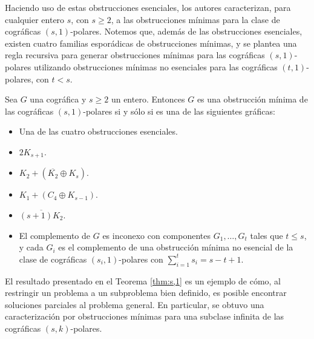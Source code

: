 Haciendo uso de estas obstrucciones esenciales,
los autores caracterizan, para cualquier entero
$s$, con $s \ge 2$, a las obstrucciones m\'inimas
para la clase de cogr\'aficas $(s,1)$-polares.
Notemos que, adem\'as de las
obstrucciones esenciales, existen cuatro familias
espor\'adicas de obstrucciones m\'inimas, y se
plantea una regla recursiva para generar
obstrucciones m\'inimas para las cogr\'aficas
$(s,1)$-polares utilizando obstrucciones
m\'inimas no esenciales para las cogr\'aficas
$(t,1)$-polares, con $t < s$.

\begin{theorem}
\label{thm:s,1}
  Sea $G$ una cográfica y $s \ge 2$ un entero. Entonces
  $G$ es una obstrucción mínima de las cográficas
  $(s,1)$-polares si y sólo si es una de las siguientes
  gráficas:

  \begin{itemize}
    \item Una de las cuatro obstrucciones esenciales.

    \item $2K_{s+1}$.

    \item $K_2 + (\overline{K_2}\oplus K_s)$.

    \item $K_1 + (C_4 \oplus K_{s-1})$.

    \item $\overline{(s+1)K_2}$.

    \item El complemento de $G$ es inconexo con componentes
      $G_1, \dots, G_t$ tales que $t \leq s$, y cada $G_i$
      es el complemento de una obstrucción mínima no esencial
      de la clase de cográficas $(s_i, 1)$-polares con
      $\sum^{t}_{i=1}s_i = s-t+1$.
  \end{itemize}
\end{theorem}


El resultado presentado en el Teorema
\ref{thm:s,1} es un ejemplo de c\'omo, al restringir
un problema a un subproblema bien definido, es posible
encontrar soluciones parciales al problema general.   En
particular, se obtuvo una caracterizaci\'on por obstrucciones
m\'inimas para una subclase infinita de las cogr\'aficas
$(s,k)$-polares.

